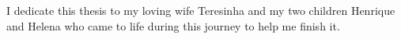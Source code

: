 

\chapter*{}

\vfill

\begin{center}
I dedicate this thesis to my loving wife Teresinha and my two children Henrique and Helena who came to life during this journey to help me finish it.
\end{center}


